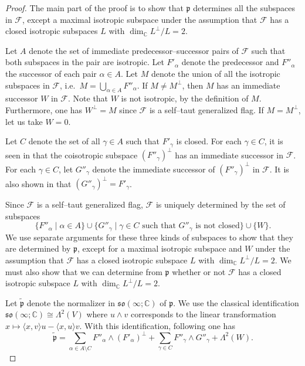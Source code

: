 \documentclass[oneside,leqno,11pt]{article}
\def\gp{\mathfrak{p}}
\def\gso{\mathfrak{so}}
\def\C{\mathbb{C}}
\def\cF{\mathcal{F}}
\begin{document}
\begin{proof}
The main part of the proof is to show that $\gp$ determines all the subspaces in $\cF$, except a maximal isotropic subspace under the assumption that $\cF$ has a closed isotropic subspaces $L$ with $\dim_\C L^\perp / L = 2$.  

Let $A$ denote the set of immediate predecessor--successor pairs of $\cF$ such that both subspaces in the pair are isotropic.  Let $F'_\alpha$ denote the predecessor and $F''_\alpha$ the successor 
of each pair $\alpha \in A$.  Let $M$ denote the union of all the isotropic subspaces in $\cF$, i.e.\ $M = \bigcup_{\alpha \in A} F''_\alpha$.  If $M \neq M^\perp$, then $M$ has an immediate successor $W$ in $\cF$.  Note that $W$ is not isotropic, by the definition of $M$.  Furthermore, one has $W^\bot = M$ since $\cF$ is a self--taut generalized flag.  If $M = M^\perp$, let us take $W = 0$.

Let $C$ denote the set of all $\gamma \in A$ such that $F'_\gamma$ is closed.  For each $\gamma \in C$, it is seen in \cite{DC2} that the coisotropic subspace $(F''_\gamma)^\perp$ has an immediate successor in $\cF$.  For each $\gamma \in C$, let $G''_\gamma$ denote the immediate successor of $(F''_\gamma)^\perp$ in $\cF$.  It is also shown in \cite{DC2} that $(G''_\gamma)^\perp = F'_\gamma$.

Since $\cF$ is a self--taut generalized flag, $\cF$ is uniquely determined by the set of subspaces $$\{ F''_\alpha \mid \alpha \in A \} \cup \{ G''_\gamma \mid \gamma \in C \textrm{ such that }G''_\gamma \textrm{ is not closed} \} \cup \{ W \}.$$  We use separate arguments for these three kinds of subspaces to show that they are determined by $\gp$, except for a maximal isotropic subspace and $W$ under the assumption that $\cF$ has a closed isotropic subspace $L$ with $\dim_\C L^\perp / L = 2$.  We must also show that we can determine from $\gp$ whether or not $\cF$ has a closed isotropic subspace $L$ with $\dim_\C L^\perp / L = 2$. 

Let $\widetilde{\gp}$ denote the normalizer in $\gso(\infty;\C)$ of $\gp$.
We use the classical identification $\gso(\infty;\C) \cong \Lambda^2(V)$ where $u\wedge v$
corresponds to the linear transformation $x \mapsto 
\langle x,v\rangle u  - \langle x,u\rangle v$.  With this identification, following \cite{DC2} one has
$$
\widetilde{\gp} = \sum_{\alpha \in A \setminus C} 
	F''_\alpha \wedge (F'_\alpha)^\perp + 
	\sum_{\gamma \in C} F''_\gamma \wedge G''_\gamma + \Lambda^2 
	(W).
$$


\end{proof}
\end{document}
